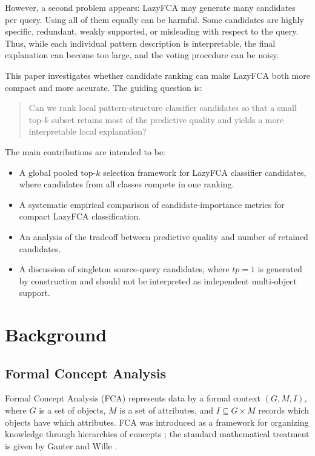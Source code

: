 \documentclass[11pt]{article}
\begin{document}
However, a second problem appears: LazyFCA may generate many candidates per
query. Using all of them equally can be harmful. Some candidates are highly
specific, redundant, weakly supported, or misleading with respect to the query.
Thus, while each individual pattern description is interpretable, the final
explanation can become too large, and the voting procedure can be noisy.

This paper investigates whether candidate ranking can make LazyFCA both more
compact and more accurate. The guiding question is:

\begin{quote}
Can we rank local pattern-structure classifier candidates so that a small
top-$k$ subset
retains most of the predictive quality and yields a more interpretable local
explanation?
\end{quote}

The main contributions are intended to be:

\begin{itemize}[leftmargin=*]
    \item A global pooled top-$k$ selection framework for LazyFCA classifier
    candidates, where candidates from all classes compete in one ranking.
    \item A systematic empirical comparison of candidate-importance metrics
    for compact LazyFCA classification.
    \item An analysis of the tradeoff between predictive quality and number of
    retained candidates.
    \item A discussion of singleton source-query candidates, where $tp=1$ is
    generated by construction and should not be interpreted as independent
    multi-object support.
\end{itemize}

\section{Background}

\subsection{Formal Concept Analysis}

Formal Concept Analysis (FCA) represents data by a formal context
$(G,M,I)$, where $G$ is a set of objects, $M$ is a set of attributes, and
$I \subseteq G \times M$ records which objects have which attributes. FCA was
introduced as a framework for organizing knowledge through hierarchies of
concepts \cite{wille2009restructuring}; the standard mathematical treatment is
given by Ganter and Wille \cite{ganter1999formal}.
\end{document}

